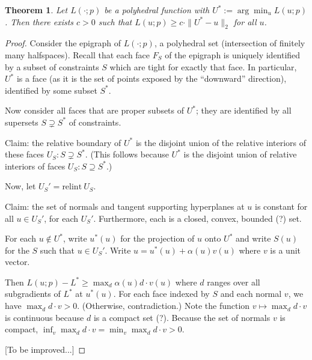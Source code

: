 \documentclass{article}
\newtheorem{theorem}{Theorem}
\theoremstyle{definition}
\begin{document}
\begin{theorem}
  Let $L(\cdot;p)$ be a polyhedral function with $U^* := \arg\min_{u} L(u;p)$.
  Then there exists $c > 0$ such that $L(u;p) \geq c \cdot \|U^* - u\|_2$ for all $u$.
\end{theorem}
\begin{proof}
  Consider the epigraph of $L(\cdot;p)$, a polyhedral set (intersection of finitely many halfspaces).
  Recall that each face $F_S$ of the epigraph is uniquely identified by a subset of constraints $S$ which are tight for exactly that face.
  In particular, $U^*$ is a face (as it is the set of points exposed by the ``downward'' direction), identified by some subset $S^*$.

  Now consider all faces that are proper subsets of $U^*$; they are identified by all supersets $S \supsetneq S^*$ of constraints.

  Claim: the relative boundary of $U^*$ is the disjoint union of the relative interiors of these faces $U_S : S \supsetneq S^*$.
  (This follows because $U^*$ is the disjoint union of relative interiors of faces $U_S: S \supseteq S^*$.)

  Now, let $U_S' = \text{relint}~U_S$.

  Claim: the set of normals and tangent supporting hyperplanes at $u$ is constant for all $u \in U_S'$, for each $U_S'$.
  Furthermore, each is a closed, convex, bounded (?) set.

  For each $u \not\in U^*$, write $u^*(u)$ for the projection of $u$ onto $U^*$ and write $S(u)$ for the $S$ such that $u \in U_S'$.
  Write $u = u^*(u) + \alpha(u) v(u)$ where $v$ is a unit vector.
  
  Then $L(u;p) - L^* \geq \max_d \alpha(u) d \cdot v(u)$ where $d$ ranges over all subgradients of $L^*$ at $u^*(u)$.
  For each face indexed by $S$ and each normal $v$, we have $\max_d d \cdot v > 0$. (Otherwise, contradiction.)
  Note the function $v \mapsto \max_d d \cdot v$ is continuous because $d$ is a compact set (?).
  Because the set of normals $v$ is compact, $\inf_v \max_d d \cdot v = \min_v \max_d d \cdot v > 0$.

  [To be improved...]
\end{proof}
\end{document}
